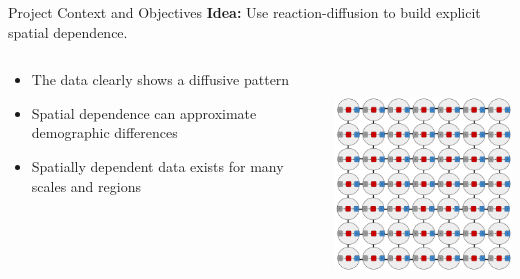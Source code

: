 \begin{slide}{Project Context and Objectives}
	{\large \textbf{Idea:} Use reaction-diffusion to build explicit spatial dependence.}
	\begin{columns}[T]
		\begin{column}{.6\textwidth}
			\vspace{2cm}
			\begin{itemize}
				\item The data clearly shows a diffusive pattern
				\item Spatial dependence can approximate demographic differences
				\item Spatially dependent data exists for many scales and regions
			\end{itemize}
		\end{column}
		\begin{column}{.4\textwidth}
			\includegraphics[height=6cm]{images/spatial-grid}
		\end{column}
	\end{columns}
\end{slide}